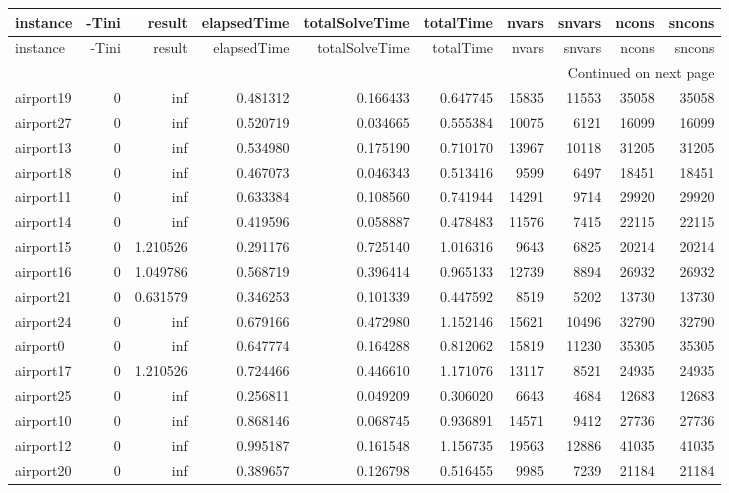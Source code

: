 \begin{longtable}{|l|r|r|r|r|r|r|r|r|r|}
\toprule
instance & -Tini & result & elapsedTime & totalSolveTime & totalTime & nvars & snvars & ncons & sncons \\
\midrule
\endfirsthead
\toprule
instance & -Tini & result & elapsedTime & totalSolveTime & totalTime & nvars & snvars & ncons & sncons \\
\midrule
\endhead
\midrule
\multicolumn{10}{r}{Continued on next page} \\
\midrule
\endfoot
\bottomrule
\endlastfoot
airport19 & 0 & inf & 0.481312 & 0.166433 & 0.647745 & 15835 & 11553 & 35058 & 35058 \\
airport27 & 0 & inf & 0.520719 & 0.034665 & 0.555384 & 10075 & 6121 & 16099 & 16099 \\
airport13 & 0 & inf & 0.534980 & 0.175190 & 0.710170 & 13967 & 10118 & 31205 & 31205 \\
airport18 & 0 & inf & 0.467073 & 0.046343 & 0.513416 & 9599 & 6497 & 18451 & 18451 \\
airport11 & 0 & inf & 0.633384 & 0.108560 & 0.741944 & 14291 & 9714 & 29920 & 29920 \\
airport14 & 0 & inf & 0.419596 & 0.058887 & 0.478483 & 11576 & 7415 & 22115 & 22115 \\
airport15 & 0 & 1.210526 & 0.291176 & 0.725140 & 1.016316 & 9643 & 6825 & 20214 & 20214 \\
airport16 & 0 & 1.049786 & 0.568719 & 0.396414 & 0.965133 & 12739 & 8894 & 26932 & 26932 \\
airport21 & 0 & 0.631579 & 0.346253 & 0.101339 & 0.447592 & 8519 & 5202 & 13730 & 13730 \\
airport24 & 0 & inf & 0.679166 & 0.472980 & 1.152146 & 15621 & 10496 & 32790 & 32790 \\
airport0 & 0 & inf & 0.647774 & 0.164288 & 0.812062 & 15819 & 11230 & 35305 & 35305 \\
airport17 & 0 & 1.210526 & 0.724466 & 0.446610 & 1.171076 & 13117 & 8521 & 24935 & 24935 \\
airport25 & 0 & inf & 0.256811 & 0.049209 & 0.306020 & 6643 & 4684 & 12683 & 12683 \\
airport10 & 0 & inf & 0.868146 & 0.068745 & 0.936891 & 14571 & 9412 & 27736 & 27736 \\
airport12 & 0 & inf & 0.995187 & 0.161548 & 1.156735 & 19563 & 12886 & 41035 & 41035 \\
airport20 & 0 & inf & 0.389657 & 0.126798 & 0.516455 & 9985 & 7239 & 21184 & 21184 \\

\end{longtable}
